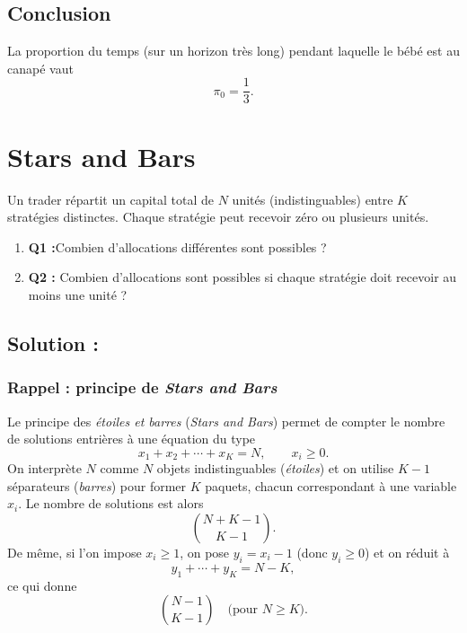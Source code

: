 \subsection*{Conclusion}

La proportion du temps (sur un horizon tr\`es long) pendant laquelle le b\'eb\'e est au canap\'e vaut
\[
\boxed{\pi_0=\frac{1}{3}}.
\]



\section{Stars and Bars}



\begin{exerciseBox}
Un trader r\'epartit un capital total de $N$ unit\'es (indistinguables) entre $K$ strat\'egies distinctes. 
Chaque strat\'egie peut recevoir z\'ero ou plusieurs unit\'es.

\begin{enumerate}
  \item \textbf{Q1 :}Combien d'allocations diff\'erentes sont possibles ?
  \item \textbf{Q2 :} Combien d'allocations sont possibles si chaque strat\'egie doit recevoir au moins une unit\'e ?
\end{enumerate}
\end{exerciseBox}



\subsection*{Solution :}

\subsubsection*{Rappel : principe de \emph{Stars and Bars}}

Le principe des \emph{\'etoiles et barres} (\emph{Stars and Bars}) permet de compter le nombre de solutions entri\`eres \`a une \'equation du type
\[
x_1 + x_2 + \cdots + x_K = N,
\qquad x_i \ge 0.
\]
On interpr\`ete $N$ comme $N$ objets indistinguables (\emph{\'etoiles}) et on utilise $K-1$ s\'eparateurs (\emph{barres}) pour former $K$ paquets, chacun correspondant \`a une variable $x_i$.
Le nombre de solutions est alors
\[
\boxed{\binom{N+K-1}{K-1}}.
\]
De m\^eme, si l'on impose $x_i\ge 1$, on pose $y_i=x_i-1$ (donc $y_i\ge 0$) et on r\'eduit \`a
\[
y_1+\cdots+y_K = N-K,
\]
ce qui donne
\[
\boxed{\binom{N-1}{K-1}} \quad \text{(pour } N\ge K\text{)}.
\]

